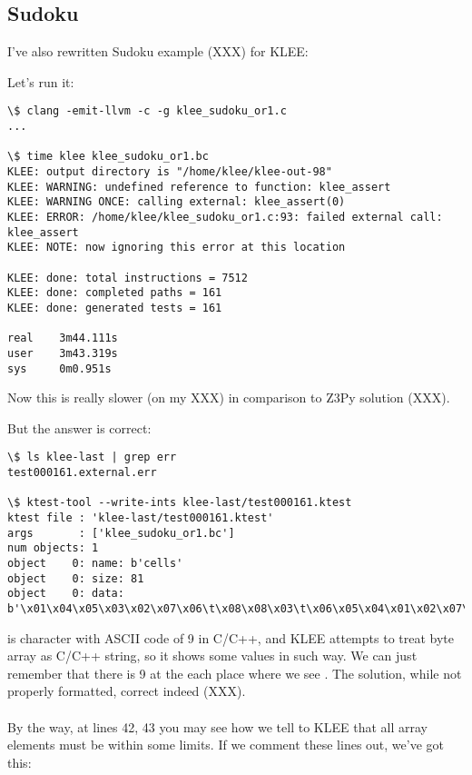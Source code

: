 \subsection{Sudoku}

I've also rewritten Sudoku example (XXX) for KLEE: %



Let's run it:

\begin{lstlisting}
\$ clang -emit-llvm -c -g klee_sudoku_or1.c
...

\$ time klee klee_sudoku_or1.bc
KLEE: output directory is "/home/klee/klee-out-98"
KLEE: WARNING: undefined reference to function: klee_assert
KLEE: WARNING ONCE: calling external: klee_assert(0)
KLEE: ERROR: /home/klee/klee_sudoku_or1.c:93: failed external call: klee_assert
KLEE: NOTE: now ignoring this error at this location

KLEE: done: total instructions = 7512
KLEE: done: completed paths = 161
KLEE: done: generated tests = 161

real    3m44.111s
user    3m43.319s
sys     0m0.951s
\end{lstlisting}

Now this is really slower (on my XXX) in comparison to Z3Py solution (XXX). %

But the answer is correct:

\begin{lstlisting}
\$ ls klee-last | grep err
test000161.external.err

\$ ktest-tool --write-ints klee-last/test000161.ktest
ktest file : 'klee-last/test000161.ktest'
args       : ['klee_sudoku_or1.bc']
num objects: 1
object    0: name: b'cells'
object    0: size: 81
object    0: data: b'\x01\x04\x05\x03\x02\x07\x06\t\x08\x08\x03\t\x06\x05\x04\x01\x02\x07\x06\x07\x02\t\x01\x08\x05\x04\x03\x04\t\x06\x01\x08\x05\x03\x07\x02\x02\x01\x08\x04\x07\x03\t\x05\x06\x07\x05\x03\x02\t\x06\x04\x08\x01\x03\x06\x07\x05\x04\x02\x08\x01\t\t\x08\x04\x07\x06\x01\x02\x03\x05\x05\x02\x01\x08\x03\t\x07\x06\x04'
\end{lstlisting}

\TT{\\t} is character with ASCII code of 9 in C/C++, and KLEE attempts to treat byte array as C/C++ string, so it shows some values in such way.
We can just remember that there is 9 at the each place where we see \TT{\\t}.
The solution, while not properly formatted, correct indeed (XXX).\\ %
\\
By the way, at lines 42, 43 you may see how we tell to KLEE that all array elements must be within some limits.
If we comment these lines out, we've got this:


